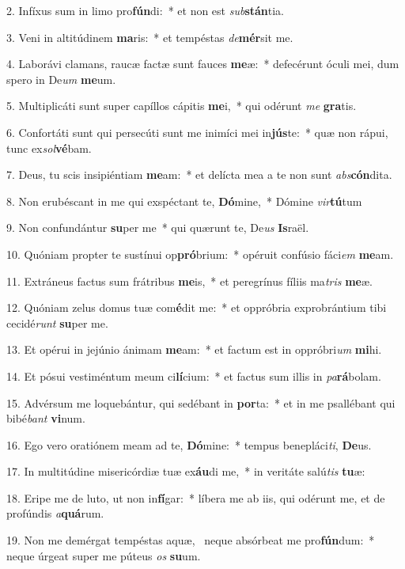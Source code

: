2. Infíxus sum in limo pro\textbf{fún}di:~*  et non est \textit{sub}\textbf{stán}tia.\

3. Veni in altitúdinem \textbf{ma}ris:~*  et tempéstas \textit{de}\textbf{mér}sit me.\

4. Laborávi clamans, raucæ factæ sunt fauces \textbf{me}æ:~*  defecérunt óculi mei, dum spero in De\textit{um} \textbf{me}um.\

5. Multiplicáti sunt super capíllos cápitis \textbf{me}i,~*  qui odérunt \textit{me} \textbf{gra}tis.\

6. Confortáti sunt qui persecúti sunt me inimíci mei in\textbf{jús}te:~*  quæ non rápui, tunc ex\textit{sol}\textbf{vé}bam.\

7. Deus, tu scis insipiéntiam \textbf{me}am:~*  et delícta mea a te non sunt \textit{abs}\textbf{cón}dita.\

8. Non erubéscant in me qui exspéctant te, \textbf{Dó}mine,~*  Dómine \textit{vir}\textbf{tú}tum\

9. Non confundántur \textbf{su}per me~*  qui quærunt te, De\textit{us} \textbf{Is}raël.\

10. Quóniam propter te sustínui op\textbf{pró}brium:~*  opéruit confúsio fáci\textit{em} \textbf{me}am.\

11. Extráneus factus sum frátribus \textbf{me}is,~*  et peregrínus fíliis ma\textit{tris} \textbf{me}æ.\

12. Quóniam zelus domus tuæ com\textbf{é}dit me:~*  et oppróbria exprobrántium tibi cecidé\textit{runt} \textbf{su}per me.\

13. Et opérui in jejúnio ánimam \textbf{me}am:~*  et factum est in oppróbri\textit{um} \textbf{mi}hi.\

14. Et pósui vestiméntum meum ci\textbf{lí}cium:~*  et factus sum illis in \textit{pa}\textbf{rá}bolam.\

15. Advérsum me loquebántur, qui sedébant in \textbf{por}ta:~*  et in me psallébant qui bibé\textit{bant} \textbf{vi}num.\

16. Ego vero oratiónem meam ad te, \textbf{Dó}mine:~*  tempus benepláci\textit{ti}, \textbf{De}us.\

17. In multitúdine misericórdiæ tuæ ex\textbf{áu}di me,~*  in veritáte salú\textit{tis} \textbf{tu}æ:\

18. Eripe me de luto, ut non in\textbf{fí}gar:~*  líbera me ab iis, qui odérunt me, et de profúndis \textit{a}\textbf{quá}rum.\

19. Non me demérgat tempéstas aquæ, \dag\  neque absórbeat me pro\textbf{fún}dum:~*  neque úrgeat super me púteus \textit{os} \textbf{su}um.\

